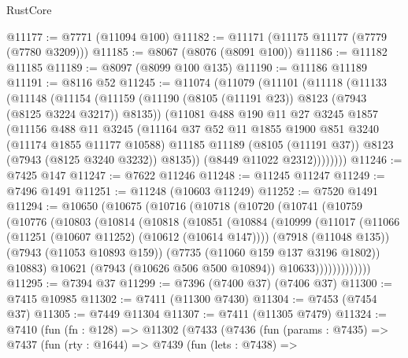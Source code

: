 \begin{lexlean}{RustCore}
\begin{coremodule}
@11177 := @7771 (@11094 @100)
@11182 := @11171 (@11175 @11177 (@7779 (@7780 @3209)))
@11185 := @8067 (@8076 (@8091 @100))
@11186 := @11182 @11185
@11189 := @8097 (@8099 @100 @135)
@11190 := @11186 @11189
@11191 := @8116 @52
@11245 := @11074
    (@11079
      (@11101
        (@11118
          (@11133
            (@11148
              (@11154
                (@11159 (@11190 (@8105 (@11191 @23)) @8123 (@7943 (@8125 @3224 @3217)) @8135))
                (@11081
                  @488
                  @190
                  @11
                  @27
                  @3245
                  @1857
                  (@11156
                    @488
                    @11
                    @3245
                    (@11164
                      @37
                      @52
                      @11
                      @1855
                      @1900
                      @851
                      @3240
                      (@11174 @1855 @11177 @10588)
                      @11185
                      @11189
                      (@8105 (@11191 @37))
                      @8123
                      (@7943 (@8125 @3240 @3232))
                      @8135))
                  (@8449 @11022 @2312))))))))
@11246 := @7425 @147
@11247 := @7622 @11246
@11248 := @11245 @11247
@11249 := @7496 @1491
@11251 := @11248 (@10603 @11249)
@11252 := @7520 @1491
@11294 := @10650
    (@10675
      (@10716
        (@10718
          (@10720
            (@10741
              (@10759
                (@10776
                  (@10803
                    (@10814
                      (@10818
                        (@10851
                          (@10884
                            (@10999
                              (@11017
                                (@11066 (@11251 (@10607 @11252) (@10612 (@10614 @147))))
                                (@7918 (@11048 @135))
                                (@7943 (@11053 @10893 @159))
                                (@7735 (@11060 @159 @137 @3196 @1802))
                                @10883)
                              @10621
                              (@7943 (@10626 @506 @500 @10894))
                              @10633)))))))))))))
@11295 := @7394 @37
@11299 := @7396 (@7400 @37) (@7406 @37)
@11300 := @7415 @10985
@11302 := @7411 (@11300 @7430)
@11304 := @7453 (@7454 @37)
@11305 := @7449 @11304
@11307 := @7411 (@11305 @7479)
@11324 := @7410
    (fun (fn : @128) =>
    @11302
      (@7433
        (@7436
          (fun (params : @7435) =>
          @7437
            (fun (rty : @1644) =>
            @7439
              (fun (lets : @7438) =>

\end{coremodule}
\end{lexlean}
